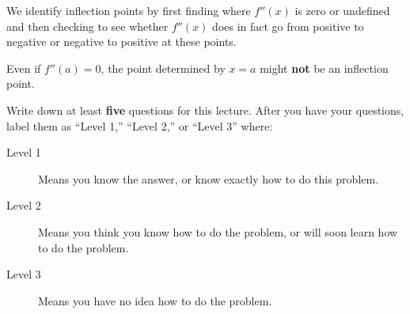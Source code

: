 \documentclass{ximera}
\begin{document}
We identify inflection points by first finding where $f''(x)$ is zero
or undefined and then checking to see whether $f''(x)$ does in fact go
from positive to negative or negative to positive at these points.

\begin{warning}
Even if $f''(a) = 0$, the point determined by $x=a$ might \textbf{not}
be an inflection point.
\end{warning}


\begin{question}
Write down at least \textbf{five} questions for this lecture. After
you have your questions, label them as ``Level 1,'' ``Level 2,'' or ``Level 3'' where:
\begin{description}
\item[Level 1] Means you know the answer, or know exactly how to do this problem.
\item[Level 2] Means you think you know how to do the problem, or will soon learn how to do the problem.
\item[Level 3] Means you have no idea how to do the problem. 
\end{description}
  \begin{freeResponse}
  \end{freeResponse}
\end{question}
\end{document}
